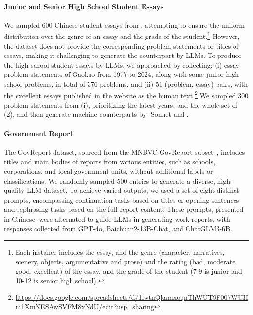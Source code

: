 \paragraph{Junior and Senior High School Student Essays}
We sampled 600 Chinese student essays from \citet{song-etal-2020-multi}, attempting to ensure the uniform distribution over the genre of an essay and the grade of the student.\footnote{Each instance includes the essay, and the genre (character, narratives, scenery, objects, argumentative and prose) and the rating (bad, moderate, good, excellent) of the essay, and the grade of the student (7-9 is junior and 10-12 is senior high school).}
However, the dataset does not provide the corresponding problem statements or titles of essays, making it challenging to generate the counterpart by LLMs. To produce the high school student essays by LLMs, we approached by collecting:
(i) essay problem statements of Gaokao from 1977 to 2024, along with some junior high school problems, in total of 376 problems, and (ii) 51 (problem, essay) pairs, with the excellent essays published in the website as the human text.\footnote{\url{https://docs.google.com/spreadsheets/d/1iwtnQkamxoqnThWUT9F007WUHm1XmNESAwSVFM8xNdU/edit?usp=sharing}} 
% 
We sampled 300 problem statements from (i), prioritizing the latest years, and the whole set of (2), and then generate machine counterparts by -Sonnet and \chatglmfour.



\paragraph{Government Report}
The GovReport dataset, sourced from the MNBVC GovReport subset~\cite{mnbvc}, includes titles and main bodies of reports from various entities, such as schools, corporations, and local government units, without additional labels or classifications. We randomly sampled 500 entries to generate a diverse, high-quality LLM dataset. To achieve varied outputs, we used a set of eight distinct prompts, encompassing continuation tasks based on titles or opening sentences and rephrasing tasks based on the full report content. These prompts, presented in Chinese, were alternated to guide LLMs in generating work reports, with responses collected from GPT-4o, Baichuan2-13B-Chat, and ChatGLM3-6B.




